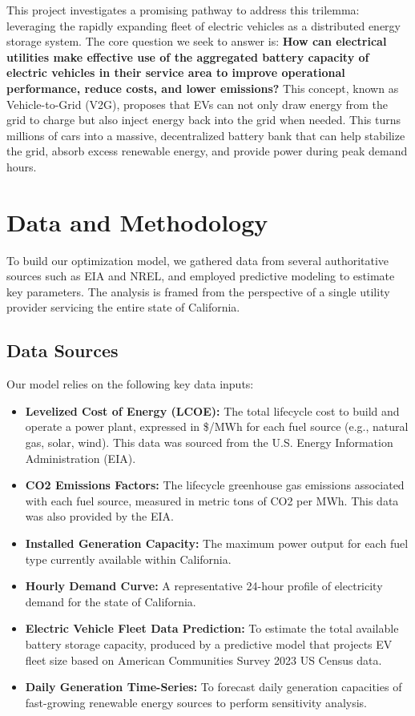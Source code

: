 \documentclass[12pt, letterpaper]{article}
\begin{document}
This project investigates a promising pathway to address this trilemma: leveraging the rapidly expanding fleet of electric vehicles as a distributed energy storage system. The core question we seek to answer is: \textbf{How can electrical utilities make effective use of the aggregated battery capacity of electric vehicles in their service area to improve operational performance, reduce costs, and lower emissions?} This concept, known as Vehicle-to-Grid (V2G), proposes that EVs can not only draw energy from the grid to charge but also inject energy back into the grid when needed. This turns millions of cars into a massive, decentralized battery bank that can help stabilize the grid, absorb excess renewable energy, and provide power during peak demand hours.

\section{Data and Methodology}

To build our optimization model, we gathered data from several authoritative sources such as EIA and NREL, and employed predictive modeling to estimate key parameters. The analysis is framed from the perspective of a single utility provider servicing the entire state of California.

\subsection{Data Sources}
Our model relies on the following key data inputs:
\begin{itemize}
    \item \textbf{Levelized Cost of Energy (LCOE):} The total lifecycle cost to build and operate a power plant, expressed in \$/MWh for each fuel source (e.g., natural gas, solar, wind). This data was sourced from the U.S. Energy Information Administration (EIA).
    \item \textbf{CO2 Emissions Factors:} The lifecycle greenhouse gas emissions associated with each fuel source, measured in metric tons of CO2 per MWh. This data was also provided by the EIA.
    \item \textbf{Installed Generation Capacity:} The maximum power output for each fuel type currently available within California.
    \item \textbf{Hourly Demand Curve:} A representative 24-hour profile of electricity demand for the state of California.
    \item \textbf{Electric Vehicle Fleet Data Prediction:} To estimate the total available battery storage capacity, produced by a predictive model that projects EV fleet size based on American Communities Survey 2023 US Census data.
    \item \textbf{Daily Generation Time-Series:} To forecast daily generation capacities of fast-growing renewable energy sources to perform sensitivity analysis.
\end{itemize}
\end{document}
